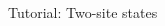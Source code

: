\begin{frame}[fragile]{Tutorial: Two-site states}
\begin{columns}
\begin{column}{5cm}
\end{column}

\end{columns}

\end{frame}
